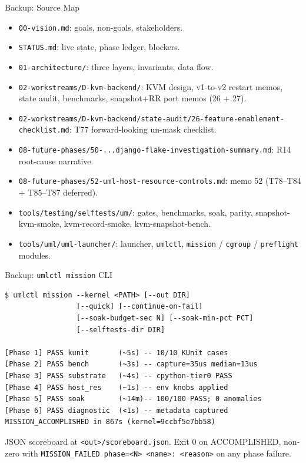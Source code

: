 \documentclass[aspectratio=169,11pt]{beamer}
\begin{document}
\begin{frame}{Backup: Source Map}
\small
\begin{itemize}
  \item \texttt{00-vision.md}: goals, non-goals, stakeholders.
  \item \texttt{STATUS.md}: live state, phase ledger, blockers.
  \item \texttt{01-architecture/}: three layers, invariants, data flow.
  \item \texttt{02-workstreams/D-kvm-backend/}: KVM design, v1-to-v2 restart memos, state audit, benchmarks, snapshot+RR port memos (26 + 27).
  \item \texttt{02-workstreams/D-kvm-backend/state-audit/26-feature-enablement-checklist.md}: T77 forward-looking un-mask checklist.
  \item \texttt{08-future-phases/50-...django-flake-investigation-summary.md}: R14 root-cause narrative.
  \item \texttt{08-future-phases/52-uml-host-resource-controls.md}: memo 52 (T78--T84 + T85--T87 deferred).
  \item \texttt{tools/testing/selftests/um/}: gates, benchmarks, soak, parity, snapshot-kvm-smoke, kvm-record-smoke, kvm-snapshot-bench.
  \item \texttt{tools/uml/uml-launcher/}: launcher, \texttt{umlctl}, \texttt{mission} / \texttt{cgroup} / \texttt{preflight} modules.
\end{itemize}
\end{frame}

\begin{frame}[fragile]{Backup: \texttt{umlctl mission} CLI}
\small
\begin{verbatim}
$ umlctl mission --kernel <PATH> [--out DIR]
                 [--quick] [--continue-on-fail]
                 [--soak-budget-sec N] [--soak-min-pct PCT]
                 [--selftests-dir DIR]

[Phase 1] PASS kunit       (~5s) -- 10/10 KUnit cases
[Phase 2] PASS bench       (~3s) -- capture=35us median=13us
[Phase 3] PASS substrate   (~4s) -- cpython-tier0 PASS
[Phase 4] PASS host_res    (~1s) -- env knobs applied
[Phase 5] PASS soak        (~14m)-- 100/100 PASS; 0 anomalies
[Phase 6] PASS diagnostic  (<1s) -- metadata captured
MISSION_ACCOMPLISHED in 867s (kernel=9ccbf5e7bb58)
\end{verbatim}
\scriptsize
JSON scoreboard at \texttt{<out>/scoreboard.json}. Exit 0 on
ACCOMPLISHED, non-zero with \texttt{MISSION\_FAILED phase=<N> <name>:
<reason>} on any phase failure.
\end{frame}
\end{document}

